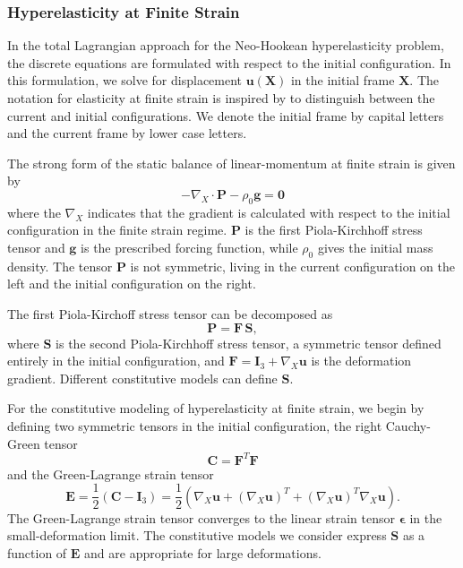 \subsubsection{Hyperelasticity at Finite Strain}

In the total Lagrangian approach for the Neo-Hookean hyperelasticity problem, the discrete equations are formulated with respect to the initial configuration.
In this formulation, we solve for displacement $\mathbf u \left( \mathbf X \right)$ in the initial frame $\mathbf X$.
The notation for elasticity at finite strain is inspired by \cite{holzapfel2000nonlinear} to distinguish between the current and initial configurations.
We denote the initial frame by capital letters and the current frame by lower case letters.

The strong form of the static balance of linear-momentum at finite strain is given by
\begin{equation}
   - \nabla_X \cdot \mathbf{P} - \rho_0 \mathbf{g} = \mathbf{0}
   \label{eq:sblFinS}
\end{equation} 
where the $\nabla_X$ indicates that the gradient is calculated with respect to the initial configuration in the finite strain regime.
$\mathbf{P}$ is the first Piola-Kirchhoff stress tensor and $\mathbf{g}$ is the prescribed forcing function, while $\rho_0$ gives the initial mass density.
The tensor $\mathbf{P}$ is not symmetric, living in the current configuration on the left and the initial configuration on the right.

The first Piola-Kirchoff stress tensor can be decomposed as
\begin{equation}
   \mathbf{P} = \mathbf{F} \, \mathbf{S},
   \label{eq:1st2nd}
\end{equation}
where $\mathbf{S}$ is the second Piola-Kirchhoff stress tensor, a symmetric tensor defined entirely in the initial configuration, and $\mathbf{F} = \mathbf I_3 + \nabla_X \mathbf u$ is the deformation gradient.
Different constitutive models can define $\mathbf{S}$.

For the constitutive modeling of hyperelasticity at finite strain, we begin by defining two symmetric tensors in the initial configuration, the right Cauchy-Green tensor
\begin{equation}
\mathbf C = \mathbf F^T \mathbf F
\end{equation}
and the Green-Lagrange strain tensor
\begin{equation}
   \mathbf E = \frac 1 2 \left( \mathbf C - \mathbf I_3 \right) = \frac 1 2 \left( \nabla_X \mathbf u + \left( \nabla_X \mathbf u \right)^T + \left( \nabla_X \mathbf u \right)^T \nabla_X \mathbf u \right).
   \label{eq:green-lagrange-strain}
\end{equation}
The Green-Lagrange strain tensor converges to the linear strain tensor $\boldsymbol \epsilon$ in the small-deformation limit.
The constitutive models we consider express $\mathbf S$ as a function of $\mathbf E$ and are appropriate for large deformations.

